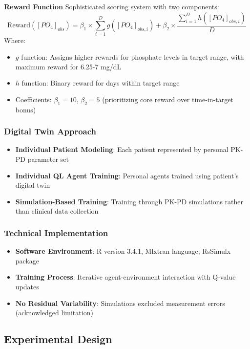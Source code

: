 \textbf{Reward Function}
Sophisticated scoring system with two components:
\begin{equation}
\mathrm{Reward}([PO_4]_{obs}) = \beta_1 \times \sum_{i=1}^{D} g([PO_4]_{obs,i}) + \beta_2 \times \frac{\sum_{i=1}^{D} h([PO_4]_{obs,i})}{D}
\end{equation}
Where:
\begin{itemize}
    \item $g$ function: Assigns higher rewards for phosphate levels in target range, with maximum reward for 6.25-7 mg/dL
    \item $h$ function: Binary reward for days within target range  
    \item Coefficients: $\beta_1 = 10$, $\beta_2 = 5$ (prioritizing core reward over time-in-target bonus)
\end{itemize}

\subsubsection{Digital Twin Approach}
\begin{itemize}
    \item \textbf{Individual Patient Modeling}: Each patient represented by personal PK-PD parameter set
    \item \textbf{Individual QL Agent Training}: Personal agents trained using patient's digital twin
    \item \textbf{Simulation-Based Training}: Training through PK-PD simulations rather than clinical data collection
\end{itemize}

\subsubsection{Technical Implementation}
\begin{itemize}
    \item \textbf{Software Environment}: R version 3.4.1, Mlxtran language, RsSimulx package
    \item \textbf{Training Process}: Iterative agent-environment interaction with Q-value updates
    \item \textbf{No Residual Variability}: Simulations excluded measurement errors (acknowledged limitation)
\end{itemize}

\subsection{Experimental Design}

